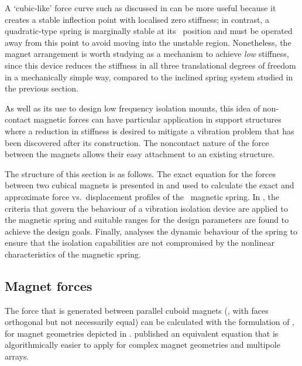 A `cubic-like' force curve such as discussed in  can be more
useful because it creates a stable inflection point with localised zero
stiffness;  in contrast, a
quadratic-type spring is marginally stable at its \qzs\ position and must be
operated away from this point to avoid moving into the unstable region.
Nonetheless, the magnet arrangement is worth studying as a mechanism to
achieve \emph{low} stiffness, since this device reduces the stiffness in all
three translational degrees of freedom in a mechanically simple way, compared
to the inclined spring system studied in the previous section.

As well as its use to design low frequency isolation mounts, this idea of
non-contact magnetic forces can have particular application in support
structures where a reduction in stiffness is desired to mitigate a vibration
problem that has been discovered after its construction. The noncontact nature
of the force between the magnets allows their easy attachment to an existing
structure.

The structure of this section is as follows. The exact equation for the
forces between two cubical magnets is presented in  and
used to calculate the exact and approximate force vs.\ displacement
profiles of the \qzs\ magnetic spring. In , the
criteria that govern the behaviour of a vibration isolation device
are applied to the magnetic spring and suitable ranges for the
design parameters are found to achieve the design goals.
Finally,  analyses the dynamic behaviour of the spring
to ensure that the isolation capabilities are not compromised by the
nonlinear characteristics of the magnetic spring.


\subsection{Magnet forces}

The force that is generated between parallel cuboid magnets (\ie, with
faces orthogonal but not necessarily equal) can be calculated
with the formulation of \textcite{akoun1984}, for magnet
geometries depicted in . \textcite{bancel1999} published
an equivalent equation that is algorithmically easier to apply for
complex magnet geometries and multipole arrays.

